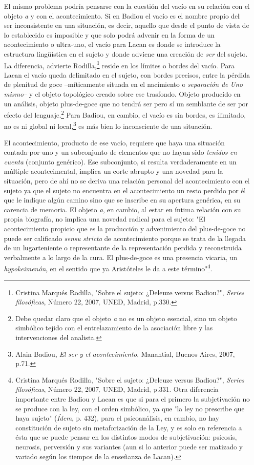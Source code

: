 \documentclass{book}
\begin{document}
El mismo problema podría pensarse con la cuestión del vacío en su
relación con el objeto \emph{a} y con el acontecimiento. Si en Badiou el
vacío es el nombre propio del ser inconsistente en una situación, es
decir, aquello que desde el punto de vista de lo establecido es
imposible y que solo podrá advenir en la forma de un acontecimiento o
ultra-uno, el vacío para Lacan es donde se introduce la estructura
lingüística en el sujeto y donde adviene una creación de \emph{ser} del
sujeto. La diferencia, advierte Rodilla,\footnote{Cristina Marqués
  Rodilla, "Sobre el sujeto: ¿Deleuze versus Badiou?", \emph{Series
  filosóficas}, Número 22, 2007, UNED, Madrid, p.330.} reside en los
límites o bordes del vacío. Para Lacan el vacío queda delimitado en el
sujeto, con bordes precisos, entre la pérdida de plenitud de goce
--míticamente situada en el nacimiento o \emph{separación de Uno
mismo}-- y el objeto topológico creado sobre ese trasfondo. Objeto
producido en un análisis, objeto plus-de-goce que no tendrá ser pero sí
un semblante de ser por efecto del lenguaje.\footnote{Debe quedar claro
  que el objeto \emph{a} no es un objeto esencial, sino un objeto
  simbólico tejido con el entrelazamiento de la asociación libre y las
  intervenciones del analista.} Para Badiou, en cambio, el vacío es sin
bordes, es ilimitado, no es ni global ni local,\footnote{Alain Badiou,
  \emph{El ser y el acontecimiento}, Manantial, Buenos Aires, 2007,
  p.71.} es más bien lo inconsciente de una situación.

El acontecimiento, producto de ese vacío, requiere que haya una
situación contada-por-uno y un subconjunto de elementos que no hayan
sido \emph{tenidos en cuenta} (conjunto genérico). Ese subconjunto, si
resulta verdaderamente en un múltiple acontecimental, implica un corte
abrupto y una novedad para la situación, pero de ahí no se deriva una
relación personal del acontecimiento con el sujeto ya que el sujeto no
encuentra en el acontecimiento un resto perdido por él que le indique
algún camino sino que se inscribe en su apertura genérica, en su
carencia de memoria. El objeto \emph{a}, en cambio, al estar en íntima
relación con su propia biografía, no implica una novedad radical para el
sujeto: "El acontecimiento propicio que es la producción y advenimiento
del plus-de-goce no puede ser calificado \emph{sensu stricto} de
acontecimiento porque se trata de la llegada de un lugarteniente o
representante de la representación perdida y reconstruida verbalmente a
lo largo de la cura. El plus-de-goce es una presencia vicaria, un
\emph{hypokeimenón}, en el sentido que ya Aristóteles le da a este
término"\footnote{Cristina Marqués Rodilla, "Sobre el sujeto: ¿Deleuze
  versus Badiou?", \emph{Series filosóficas}, Número 22, 2007, UNED,
  Madrid, p.331. Otra diferencia importante entre Badiou y Lacan es que
  si para el primero la subjetivación no se produce con la ley, con el
  orden simbólico, ya que "la ley no prescribe que haya sujeto"
  (\emph{Ídem}, p. 432), para el psicoanálisis, en cambio, no hay
  constitución de sujeto sin metaforización de la Ley, y es solo en
  referencia a ésta que se puede pensar en los distintos modos de
  subjetivación: psicosis, neurosis, perversión y sus variantes (aun si
  lo anterior puede ser matizado y variado según los tiempos de la
  enseñanza de Lacan).}.
\end{document}
